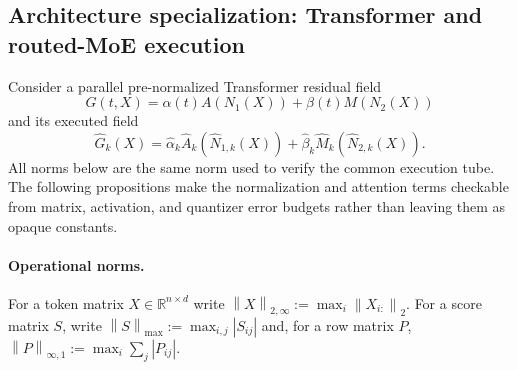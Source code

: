 \documentclass[twoside,11pt]{article}
\newcommand{\Lip}{\operatorname{Lip}}
\newcommand{\norm}[1]{\left\lVert #1\right\rVert}
\newcommand{\abs}[1]{\left\lvert #1\right\rvert}
\newcommand{\one}{\mathbf{1}}
\begin{document}
\subsection{Architecture specialization: Transformer and routed-MoE execution}
\label{sec:transformer-execution-v4}

Consider a parallel pre-normalized Transformer residual field
\begin{equation}
 G(t,X)=\alpha(t)A(N_1(X))+\beta(t)M(N_2(X))
 \label{eq:transformer-field-v4}
\end{equation}
and its executed field
\begin{equation}
 \widehat G_k(X)=
 \widehat\alpha_k\widehat A_k(\widehat N_{1,k}(X))
 +\widehat\beta_k\widehat M_k(\widehat N_{2,k}(X)).
 \label{eq:transformer-executed-field-v4}
\end{equation}
All norms below are the same norm used to verify the common execution tube.
The following propositions make the normalization and attention terms
checkable from matrix, activation, and quantizer error budgets rather than
leaving them as opaque constants.


\paragraph{Operational norms.}
For a token matrix $X\in\mathbb R^{n\times d}$ write
$\norm{X}_{2,\infty}:=\max_i\norm{X_{i:}}_2$.  For a score matrix $S$, write
$\norm{S}_{\max}:=\max_{i,j}\abs{S_{ij}}$ and, for a row matrix $P$,
$\norm{P}_{\infty,1}:=\max_i\sum_j\abs{P_{ij}}$.

\end{document}
